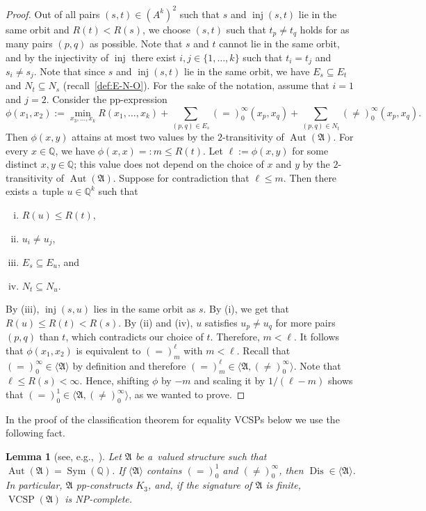 \documentclass[preprint,12pt]{elsarticle}
\newcommand{\Q}{\mathbb Q}
\newcommand{\bA}{{\mathfrak A}}
\newcommand{\checked}[1]{#1}
\DeclareMathOperator{\Aut}{Aut}
\DeclareMathOperator{\vcsp}{VCSP}
\DeclareMathOperator{\Sym}{Sym}
\DeclareMathOperator{\inj}{inj}
\DeclareMathOperator{\Dis}{Dis}
\newtheorem{lemma}[theorem]{Lemma}
\begin{document}
\begin{proof}
Out of all pairs $(s,t) \in (A^k)^2$ such that $s$ and $\inj(s,t)$ lie in the same orbit and $R(t)<R(s)$, we choose $(s,t)$ such that $t_p\neq t_q$ holds for as many pairs $(p,q)$ as possible. 
Note that $s$ and $t$ cannot lie in the same orbit, and by the injectivity of $\inj$ there exist $i,j \in \{1,\dots,k\}$ such that
$t_{i} = t_{j}$ and $s_i \neq s_j$. 
Note that since $s$ and $\inj(s,t)$ lie in the same orbit, we have $E_s \subseteq E_t$ 
and $N_t \subseteq N_s$ (recall~\cref{def:E-N-O}). 
For the sake of the notation, assume that $i=1$ and $j=2$.
Consider the \checked{pp-}expression  
 \[\phi(x_1,x_2) := \min_{x_3,\dots,x_k} R(x_1,\dots,x_k) + \sum_{(p,q) \in E_s} (=)_0^\infty(x_p,x_q) + \sum_{(p,q) \in N_t} (\neq)_0^\infty(x_p,x_q).\]
 Then $\phi(x,y)$ attains at most two values by the $2$-transitivity of $\Aut(\bA)$. For every $x \in \Q$, we have $\phi(x,x) =: m \leq R(t)$. Let $\ell := \phi(x,y)$ for some distinct $x,y \in \Q$; this value does not depend on the choice of $x$ and $y$ by the $2$-transitivity of $\Aut(\bA)$. Suppose for contradiction that $\ell \leq m$. Then there exists a~tuple $u \in \Q^k$ such that
 \begin{enumerate}[(i)]
     \item $R(u) \leq R(t)$,
     \item $u_i \neq u_j$,
     \item $E_s \subseteq E_u$, and
     \item $N_t \subseteq N_u$.
 \end{enumerate}
By (iii), $\inj(s,u)$ lies in the same orbit as $s$. By (i), we get that $R(u) \leq R(t) < R(s)$. By (ii) and (iv), $u$ satisfies $u_p \neq u_q$ for more pairs $(p,q)$ than $t$, which contradicts our choice of $t$. Therefore, $m < \ell$. It follows that $\phi(x_1, x_2)$ 
is equivalent to $(=)_m^{\ell}$ with $m < \ell$. Recall that $(=)_0^\infty \in \langle \bA \rangle$ by definition and therefore $(=)_m^\ell \in \langle \bA, (\neq)_0^\infty \rangle$.
Note that $\ell \leq R(s) < \infty$. 
Hence, shifting $\phi$ by $-m$ and scaling it by $1/(\ell - m)$ shows that
$(=)^1_0 \in \langle \bA, (\neq)_0^\infty \rangle$, as we wanted to prove.
\end{proof} 

In the proof of the classification theorem for equality VCSPs below we use the following fact.
\begin{lemma}[see, e.g.,~{\cite[Example 4.9]{Resilience-VCSPs}}]\label{lem:soft-eq}
Let $\bA$ be a~valued structure such that $\Aut(\bA) = \Sym(\Q)$. 
If $\langle\bA\rangle$ contains $(=)^1_0$ and $(\neq)_0^{\infty}$, then $\Dis \in \langle \bA \rangle$. In particular, $\bA$ pp-constructs $K_3$, and, if the signature of $\bA$ is finite,
$\vcsp(\bA)$ is NP-complete. 
\end{lemma} 
\end{document}
